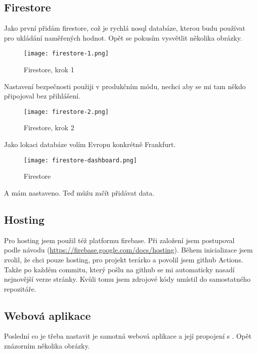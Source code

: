 \subsection{Firestore}
Jako první přidám firestore, což je rychlá \gls{nosql} databáze, kterou budu používat pro ukládání naměřených hodnot. 
Opět se pokusím vysvětlit několika obrázky.

\begin{figure}[H]
    \centering
    \texttt{[image: firestore-1.png]}
    \caption{Firestore, krok 1}
\end{figure}
Nastavení bezpečnosti použiji v produkčním módu, nechci aby se mi tam někdo připojoval bez přihlášení.
\begin{figure}[H]
    \centering
    \texttt{[image: firestore-2.png]}
    \caption{Firestore, krok 2}
\end{figure}
Jako lokaci databáze volím Evropu konkrétně Frankfurt.
\begin{figure}[H]
    \centering
    \texttt{[image: firestore-dashboard.png]}
    \caption{Firestore}
\end{figure}
A mám nastaveno. Teď můžu začít přidávat data.

\subsection{Hosting}
Pro \gls{hosting} jsem použil též platformu \gls{firebase}. Při založení jsem postupoval podle návodu 
(\url{https://firebase.google.com/docs/hosting}). Během inicializace jsem zvolil, že chci pouze \gls{hosting}, pro 
projekt terárko a povolil jsem \gls{github} Actions. Takže po každém commitu, který pošlu na \gls{github} se mi 
automaticky nasadí nejnovější verze stránky. Kvůli tomu jsem zdrojové kódy umístil do samostatného repozitáře.

\subsection{Webová aplikace}
Poslední co je třeba nastavit je samotná webová aplikace a její propojení s . Opět znázorním 
několika obrázky.


